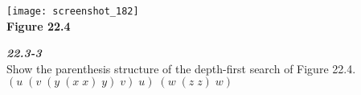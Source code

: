 \documentclass{article}
\begin{document}
\begin{center}
\texttt{[image: screenshot\_182]}\\
\textbf{Figure 22.4}
\end{center}

\textbf{\textit{22.3-3}}\\
Show the parenthesis structure of the depth-first search of Figure 22.4.\\

$(u \; (v \; (y \; (x \; x) \; y) \; v) \; u) \; (w \; (z \; z) \; w)$
\end{document}
